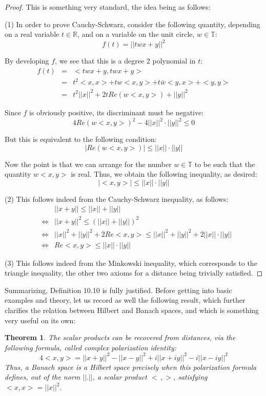 \documentclass[12pt]{amsbook}
\newtheorem{theorem}{Theorem}[chapter]
\begin{document}
\begin{proof}
This is something very standard, the idea being as follows:

\medskip

(1) In order to prove Cauchy-Schwarz, consider the following quantity, depending on a real variable $t\in\mathbb R$, and on a variable on the unit circle, $w\in\mathbb T$:
$$f(t)=||twx+y||^2$$

By developing $f$, we see that this is a degree 2 polynomial in $t$:
\begin{eqnarray*}
f(t)
&=&<twx+y,twx+y>\\
&=&t^2<x,x>+tw<x,y>+t\bar{w}<y,x>+<y,y>\\
&=&t^2||x||^2+2tRe(w<x,y>)+||y||^2
\end{eqnarray*}

Since $f$ is obviously positive, its discriminant must be negative:
$$4Re(w<x,y>)^2-4||x||^2\cdot||y||^2\leq0$$

But this is equivalent to the following condition:
$$|Re(w<x,y>)|\leq||x||\cdot||y||$$

Now the point is that we can arrange for the number $w\in\mathbb T$ to be such that the quantity $w<x,y>$ is real. Thus, we obtain the following inequality, as desired:
$$|<x,y>|\leq||x||\cdot||y||$$


(2) This follows indeed from the Cauchy-Schwarz inequality, as follows:
\begin{eqnarray*}
&&||x+y||\leq||x||+||y||\\
&\iff&||x+y||^2\leq(||x||+||y||)^2\\
&\iff&||x||^2+||y||^2+2Re<x,y>\leq||x||^2+||y||^2+2||x||\cdot||y||\\
&\iff&Re<x,y>\leq||x||\cdot||y||
\end{eqnarray*}

(3) This follows indeed from the Minkowski inequality, which corresponds to the triangle inequality, the other two axioms for a distance being trivially satisfied.
\end{proof}

Summarizing, Definition 10.10 is fully justified. Before getting into basic examples and theory, let us record as well the following result, which further clarifies the relation between Hilbert and Banach spaces, and which is something very useful on its own:

\begin{theorem}
The scalar products can be recovered from distances, via the following formula, called complex polarization identity:
$$4<x,y>
=||x+y||^2-||x-y||^2
+i||x+iy||^2-i||x-iy||^2$$
Thus, a Banach space is a Hilbert space precisely when this polarization formula defines, out of the norm $||.||$, a scalar product $<\,,>$, satisfying $<x,x>=||x||^2$.
\end{theorem}
\end{document}
